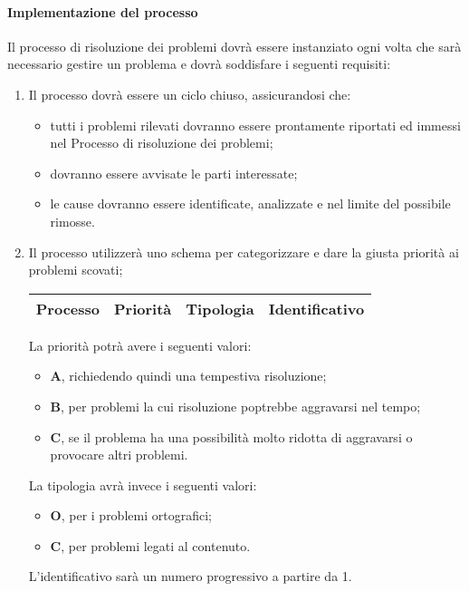 		\paragraph{Implementazione del processo}
			Il processo di risoluzione dei problemi dovrà essere instanziato ogni volta che sarà necessario gestire un problema e dovrà soddisfare i seguenti requisiti:
			\begin{enumerate}
				\item Il processo dovrà essere un ciclo chiuso, assicurandosi che:
					\begin{itemize}
				 		\item tutti i problemi rilevati dovranno essere prontamente riportati ed immessi nel Processo di risoluzione dei problemi;
					 	\item dovranno essere avvisate le parti interessate;
				 		\item le cause dovranno essere identificate, analizzate e nel limite del possibile rimosse.
					 \end{itemize}

				\item Il processo utilizzerà uno schema per categorizzare e dare la giusta priorità ai problemi scovati;

					\begin{center}
						\begin{longtable}{|c|c|c|c|}
							\hline
							\rowcolor{lighter-grayer}
							\textbf{Processo} & \textbf{Priorità} & \textbf{Tipologia} & \textbf{Identificativo}\\
							\hline
							\endfirsthead
							\hline

						\end{longtable}
					\end{center}

				 La priorità potrà avere i seguenti valori:
					\begin{itemize}
					 	\item \textbf{A}, richiedendo quindi una tempestiva risoluzione;
					 	\item \textbf{B}, per problemi la cui risoluzione poptrebbe aggravarsi nel tempo;
					 	\item \textbf{C}, se il problema ha una possibilità molto ridotta di aggravarsi o provocare altri problemi.
					 \end{itemize}
				 La tipologia avrà invece i seguenti valori:
					\begin{itemize}
						\item \textbf{O}, per i problemi ortografici;
						\item \textbf{C}, per problemi legati al contenuto.
					\end{itemize}
				 L'identificativo sarà un numero progressivo a partire da 1.


\end{enumerate}
